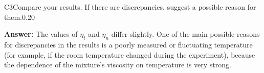 \documentclass[11pt,a4paper]{article}
\begin{document}
\begin{solcard}{C3}{Compare your results. If there are discrepancies, suggest a possible reason for them.}{0.20}
\par\smallskip\noindent\textbf{Answer:} The values of $\eta_t$ and $\eta_n$ differ slightly. One of the main possible reasons for discrepancies in the results is a poorly measured or fluctuating temperature (for example, if the room temperature changed during the experiment), because the dependence of the mixture's viscosity on temperature is very strong.
\end{solcard}
\end{document}
